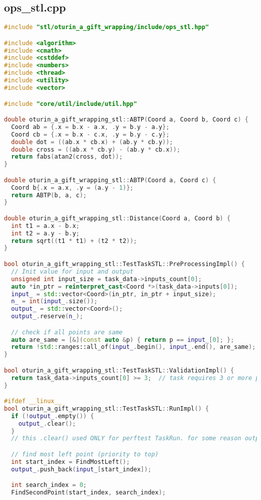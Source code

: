 \documentclass[12pt,a4paper]{extarticle}
\begin{document}
\subsection{ops\_stl.cpp}
\label{sec:stl.cpp}
\begin{lstlisting}[language=C++]
#include "stl/oturin_a_gift_wrapping/include/ops_stl.hpp"

#include <algorithm>
#include <cmath>
#include <cstddef>
#include <numbers>
#include <thread>
#include <utility>
#include <vector>

#include "core/util/include/util.hpp"

double oturin_a_gift_wrapping_stl::ABTP(Coord a, Coord b, Coord c) {
  Coord ab = {.x = b.x - a.x, .y = b.y - a.y};
  Coord cb = {.x = b.x - c.x, .y = b.y - c.y};
  double dot = ((ab.x * cb.x) + (ab.y * cb.y));
  double cross = ((ab.x * cb.y) - (ab.y * cb.x));
  return fabs(atan2(cross, dot));
}

double oturin_a_gift_wrapping_stl::ABTP(Coord a, Coord c) {
  Coord b{.x = a.x, .y = (a.y - 1)};
  return ABTP(b, a, c);
}

double oturin_a_gift_wrapping_stl::Distance(Coord a, Coord b) {
  int t1 = a.x - b.x;
  int t2 = a.y - b.y;
  return sqrt((t1 * t1) + (t2 * t2));
}

bool oturin_a_gift_wrapping_stl::TestTaskSTL::PreProcessingImpl() {
  // Init value for input and output
  unsigned int input_size = task_data->inputs_count[0];
  auto *in_ptr = reinterpret_cast<Coord *>(task_data->inputs[0]);
  input_ = std::vector<Coord>(in_ptr, in_ptr + input_size);
  n_ = int(input_.size());
  output_ = std::vector<Coord>();
  output_.reserve(n_);

  // check if all points are same
  auto are_same = [&](const auto &p) { return p == input_[0]; };
  return !std::ranges::all_of(input_.begin(), input_.end(), are_same);
}

bool oturin_a_gift_wrapping_stl::TestTaskSTL::ValidationImpl() {
  return task_data->inputs_count[0] >= 3;  // task requires 3 or more points to wrap
}

#ifdef __linux__
bool oturin_a_gift_wrapping_stl::TestTaskSTL::RunImpl() {
  if (!output_.empty()) {
    output_.clear();
  }
  // this .clear() used ONLY for perftest TaskRun. for some reason output_ has something in it

  // find most left point (priority to top)
  int start_index = FindMostLeft();
  output_.push_back(input_[start_index]);

  int search_index = 0;
  FindSecondPoint(start_index, search_index);


\end{lstlisting}
\end{document}
